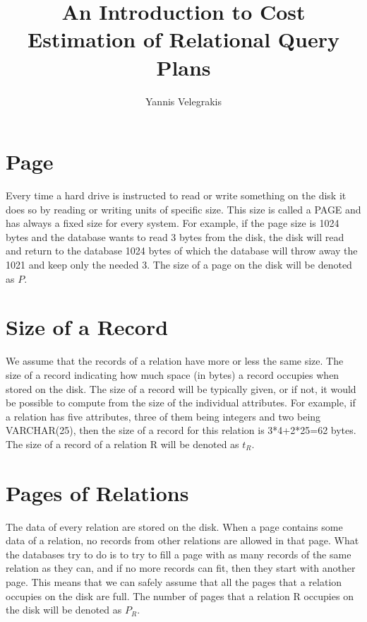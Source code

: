 \documentclass[11pt]{article}
\begin{document}
\title{An Introduction to Cost Estimation of Relational Query Plans}
\author{Yannis Velegrakis}

\maketitle

\tableofcontents

\section{Page}

Every time a hard drive is instructed to read or write something on the disk it does so by reading or writing units of specific size. This size is called a PAGE and has always a fixed size for every system. For example, if the page size is 1024 bytes and the database wants to read 3 bytes from the disk, the disk will read and return to the database 1024 bytes of which the database will throw away the 1021 and keep only the needed 3.
The size of a page on the disk will be denoted as $P$.

\section{Size of a Record}

We assume that the records of a relation have more or less the same size. The size of a record indicating how much space (in bytes) a record occupies when stored on the disk. The size of a record will be typically given, or if not, it would be possible to compute from the size of the individual attributes. For example, if a relation has five attributes, three of them being integers and two being VARCHAR(25), then the size of a record for this relation is 3*4+2*25=62 bytes. The size of a record of a relation R will be denoted as $t_R$.

\section{Pages of Relations}

The data of every relation are stored on the disk. When a page contains some data of a relation, no records from other relations are allowed in that page. What the databases try to do is to try to fill a page with as many records of the same relation as they can, and if no more records can fit, then they start with another page. This means that we can safely assume that all the pages that a relation occupies on the disk are full.
The number of pages that a relation R occupies on the disk will be denoted as $P_R$.
\end{document}
